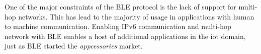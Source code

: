 One of the major constraints of the BLE protocol is the lack of support for multi-hop networks. This has lead to the majority of usage in applications with human to machine communication. Enabling IPv6 communication and multi-hop network with BLE enables a host of additional applications in the \gls{iot} domain, just as BLE started the \emph{appcessories} market.
